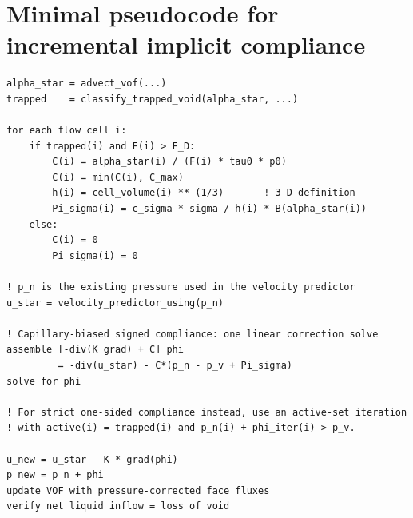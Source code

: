 \documentclass[11pt]{article}
\begin{document}
\section{Minimal pseudocode for incremental implicit compliance}

\begin{verbatim}
alpha_star = advect_vof(...)
trapped    = classify_trapped_void(alpha_star, ...)

for each flow cell i:
    if trapped(i) and F(i) > F_D:
        C(i) = alpha_star(i) / (F(i) * tau0 * p0)
        C(i) = min(C(i), C_max)
        h(i) = cell_volume(i) ** (1/3)       ! 3-D definition
        Pi_sigma(i) = c_sigma * sigma / h(i) * B(alpha_star(i))
    else:
        C(i) = 0
        Pi_sigma(i) = 0

! p_n is the existing pressure used in the velocity predictor
u_star = velocity_predictor_using(p_n)

! Capillary-biased signed compliance: one linear correction solve
assemble [-div(K grad) + C] phi
         = -div(u_star) - C*(p_n - p_v + Pi_sigma)
solve for phi

! For strict one-sided compliance instead, use an active-set iteration
! with active(i) = trapped(i) and p_n(i) + phi_iter(i) > p_v.

u_new = u_star - K * grad(phi)
p_new = p_n + phi
update VOF with pressure-corrected face fluxes
verify net liquid inflow = loss of void
\end{verbatim}
\end{document}
